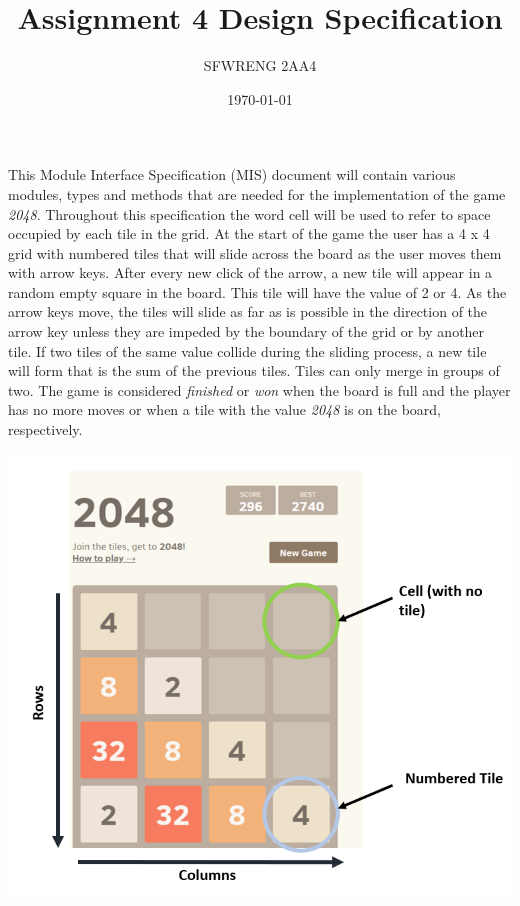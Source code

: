 \documentclass[12pt]{article}
\title{Assignment 4 Design Specification}
\author{SFWRENG 2AA4}
\date{\today}
\begin{document}
\maketitle




This Module Interface Specification (MIS) document will contain various modules, types and methods that are needed for the implementation of the game \emph{2048}. Throughout this specification the word cell will be used to refer to space occupied by each tile in the grid. At the start of the game the user has a 4 x 4 grid with numbered tiles that will slide across the board as the user moves them with arrow keys. After every new click of the arrow, a new tile will appear in a random empty square in the board. This tile will have the value of 2 or 4. As the arrow keys move, the tiles will slide as far as is possible in the direction of the arrow key unless they are impeded by the boundary of the grid or by another tile. If two tiles of the same value collide during the sliding process, a new tile will form that is the sum of the previous tiles. Tiles can only merge in groups of two. The game is considered \emph{finished} or \emph{won} when the board is full and the player has no more moves or when a tile with the value \emph{2048} is on the board, respectively. 

\begin{center}
	\includegraphics[scale = 0.70]{IntroToTerm.png}
\end{center}
\newpage
\end{document}
